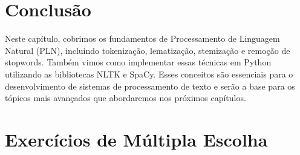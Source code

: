 \documentclass[14pt,a4paper,oneside]{book}
\begin{document}
\section{Conclusão}

Neste capítulo, cobrimos os fundamentos de Processamento de Linguagem Natural (PLN), incluindo tokenização, lematização, stemização e remoção de stopwords. Também vimos como implementar essas técnicas em Python utilizando as bibliotecas NLTK e SpaCy. Esses conceitos são essenciais para o desenvolvimento de sistemas de processamento de texto e serão a base para os tópicos mais avançados que abordaremos nos próximos capítulos.

\newpage

\section{Exercícios de Múltipla Escolha}
\end{document}

